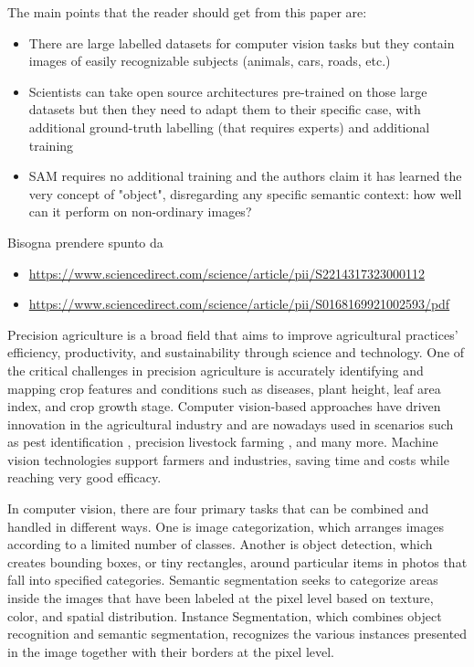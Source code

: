 \documentclass[runningheads]{llncs}
\begin{document}
{
\color{red} The main points that the reader should get from this paper are:
\begin{itemize}
\item There are large labelled datasets for computer vision tasks but they contain images of easily recognizable subjects (animals, cars, roads, etc.)
\item Scientists can take open source architectures pre-trained on those large datasets but then they need to adapt them to their specific case, with additional ground-truth labelling (that requires experts) and additional training
\item SAM requires no additional training and the authors claim it has learned the very concept of "object", disregarding any specific semantic context: how well can it perform on non-ordinary images?
\end{itemize}
Bisogna prendere spunto da 
\begin{itemize}
\item \url{https://www.sciencedirect.com/science/article/pii/S2214317323000112}
\item \url{https://www.sciencedirect.com/science/article/pii/S0168169921002593/pdf}
\end{itemize}
}

Precision agriculture is a broad field that aims to improve agricultural practices' efficiency, productivity, and sustainability through science and technology. One of the critical challenges in precision agriculture is accurately identifying and mapping crop features and conditions such as diseases, plant height, leaf area index, and crop growth stage. Computer vision-based approaches have driven innovation in the agricultural industry and are nowadays used in scenarios such as pest identification \cite{yuan_advanced_2022}, precision livestock farming \cite{QIAO2019104958}, and many more.  Machine vision technologies support farmers and industries, saving time and costs while reaching very good efficacy. 

In computer vision, there are four primary tasks that can be combined and handled in different ways. One is image categorization, which arranges images according to a limited number of classes. Another is object detection, which creates bounding boxes, or tiny rectangles, around particular items in photos that fall into specified categories. Semantic segmentation seeks to categorize areas inside the images that have been labeled at the pixel level based on texture, color, and spatial distribution. Instance Segmentation, which combines object recognition and semantic segmentation, recognizes the various instances presented in the image together with their borders at the pixel level.
\end{document}
